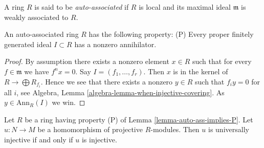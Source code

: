 \begin{definition}
\label{definition-auto-ass}
A ring $R$ is said to be {\it auto-associated} if $R$ is local and its
maximal ideal $\mathfrak m$ is weakly associated to $R$.
\end{definition}

\begin{lemma}
\label{lemma-auto-ass-implies-P}
An auto-associated ring $R$ has the following property: (P)
Every proper finitely generated ideal $I \subset R$ has a nonzero
annihilator.
\end{lemma}

\begin{proof}
By assumption there exists a nonzero element $x \in R$ such that for every
$f \in \mathfrak m$ we have $f^n x = 0$. Say $I = (f_1, \ldots, f_r)$.
Then $x$ is in the kernel of $R \to \bigoplus R_{f_i}$. Hence we see
that there exists a nonzero $y \in R$ such that $f_i y = 0$ for all $i$, see
Algebra, Lemma \ref{algebra-lemma-when-injective-covering}.
As $y \in \text{Ann}_R(I)$ we win.
\end{proof}

\begin{lemma}
\label{lemma-P-universally-injective}
Let $R$ be a ring having property (P) of
Lemma \ref{lemma-auto-ass-implies-P}.
Let $u : N \to M$ be a homomorphism of projective $R$-modules.
Then $u$ is universally injective if and only if $u$ is injective.
\end{lemma}

